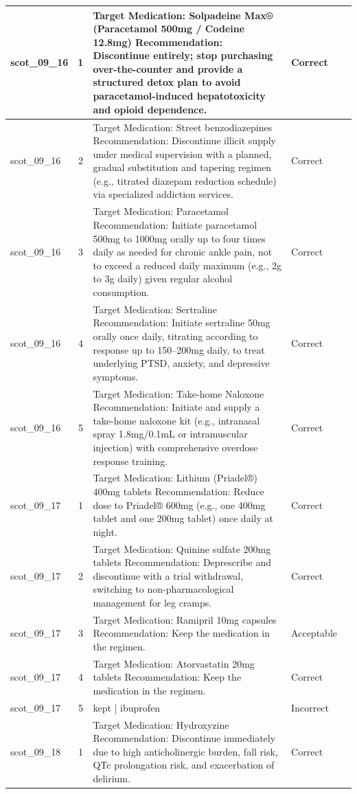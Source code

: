 \begin{longtable}{|p{1.45cm}|c|p{10.2cm}|p{1.55cm}|p{2.3cm}|}
\hline
scot\_09\_16 & 1 & Target Medication: Solpadeine Max® (Paracetamol 500mg / Codeine 12.8mg) Recommendation: Discontinue entirely; stop purchasing over-the-counter and provide a structured detox plan to avoid paracetamol-induced hepatotoxicity and opioid dependence. & Correct &  \\
\hline
scot\_09\_16 & 2 & Target Medication: Street benzodiazepines Recommendation: Discontinue illicit supply under medical supervision with a planned, gradual substitution and tapering regimen (e.g., titrated diazepam reduction schedule) via specialized addiction services. & Correct &  \\
\hline
scot\_09\_16 & 3 & Target Medication: Paracetamol Recommendation: Initiate paracetamol 500mg to 1000mg orally up to four times daily as needed for chronic ankle pain, not to exceed a reduced daily maximum (e.g., 2g to 3g daily) given regular alcohol consumption. & Correct &  \\
\hline
scot\_09\_16 & 4 & Target Medication: Sertraline Recommendation: Initiate sertraline 50mg orally once daily, titrating according to response up to 150–200mg daily, to treat underlying PTSD, anxiety, and depressive symptoms. & Correct &  \\
\hline
scot\_09\_16 & 5 & Target Medication: Take-home Naloxone Recommendation: Initiate and supply a take-home naloxone kit (e.g., intranasal spray 1.8mg/0.1mL or intramuscular injection) with comprehensive overdose response training. & Correct &  \\
\hline
scot\_09\_17 & 1 & Target Medication: Lithium (Priadel®) 400mg tablets Recommendation: Reduce dose to Priadel® 600mg (e.g., one 400mg tablet and one 200mg tablet) once daily at night. & Correct &  \\
\hline
scot\_09\_17 & 2 & Target Medication: Quinine sulfate 200mg tablets Recommendation: Deprescribe and discontinue with a trial withdrawal, switching to non-pharmacological management for leg cramps. & Correct &  \\
\hline
scot\_09\_17 & 3 & Target Medication: Ramipril 10mg capsules Recommendation: Keep the medication in the regimen. & Acceptable &  \\
\hline
scot\_09\_17 & 4 & Target Medication: Atorvastatin 20mg tablets Recommendation: Keep the medication in the regimen. & Correct &  \\
\hline
scot\_09\_17 & 5 & kept | ibuprofen & Incorrect &  \\
\hline
scot\_09\_18 & 1 & Target Medication: Hydroxyzine Recommendation: Discontinue immediately due to high anticholinergic burden, fall risk, QTc prolongation risk, and exacerbation of delirium. & Correct &  \\

\end{longtable}
